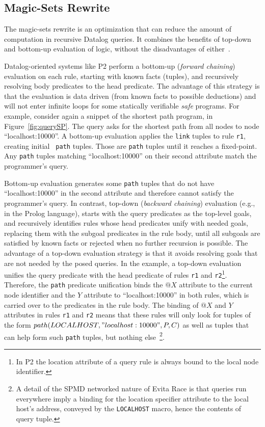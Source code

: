 \documentclass{sigmod08}
\newcommand{\ol}[1]{\texttt{\small #1}\xspace}
\begin{document}
\subsection{Magic-Sets Rewrite}
\label{sec:magic}

The magic-sets rewrite is an optimization that can reduce the amount 
of computation in recursive Datalog queries. It combines the
benefits of top-down and bottom-up evaluation of logic,
without the disadvantages of either~\cite{ullmanNotes}. 

Datalog-oriented systems like P2 perform a bottom-up (\emph{forward chaining}) evaluation 
on each rule, starting with known facts (tuples), and recursively
resolving body predicates to the head predicate. The advantage of this strategy is
that the evaluation is data driven (from known facts to possible
deductions) and will not enter infinite loops for some statically
verifiable \emph{safe} programs. 
For example, consider again a snippet of the shortest path program, in
Figure~\ref{fig:querySP}. The query asks for the shortest
path from all nodes to node ``localhost:10000''. A bottom-up evaluation
applies the \ol{link} tuples to rule \ol{r1}, creating initial {\tt
path} tuples. Those are \ol{path} tuples until it reaches a
fixed-point.  Any \ol{path} tuples matching
``localhost:10000'' on their second attribute match the programmer's query.

Bottom-up evaluation generates some \ol{path} tuples that do not have
``localhost:10000'' in the second attribute and therefore cannot satisfy
the programmer's query.  In contrast, top-down
(\emph{backward chaining}) evaluation (e.g., in the Prolog language), starts with the query
predicates as the top-level goals, and recursively identifies rules
whose head predicates unify with needed goals, replacing them with the
subgoal predicates in the rule body, until all subgoals are satisfied by
known facts or rejected when no further recursion is possible. The
advantage of a top-down evaluation strategy is that it avoids resolving
goals that are not needed by the posed queries.  In the example, a top-down
evaluation unifies the query
predicate with the head predicate of rules \ol{r1} and
\ol{r2}\footnote{In P2 the location attribute of a query rule is always
bound to the local node identifier.}.  Therefore, the \ol{path}
predicate unification binds the $@X$ attribute to the current node
identifier and the $Y$ attribute to ``localhost:10000'' in both rules,
which is carried over to the predicates in the rule body. The binding of
$@X$ and $Y$ attributes in rules \ol{r1} and \ol{r2} means that these
rules will only look for tuples of the form
$path(LOCALHOST,"localhost:10000",P,C)$ as well as tuples that can help form
such \ol{path} tuples, but nothing else~\footnote{A
detail of the SPMD networked nature of Evita Race is that queries run
everywhere imply a binding for the location specifier attribute to the
local host's address, conveyed by the \ol{LOCALHOST} macro, hence the
contents of query tuple.}.
\end{document}
